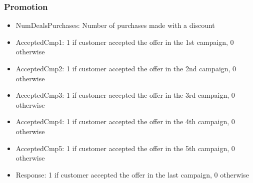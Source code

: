 \documentclass[letterpaper,11pt]{article}
\begin{document}
\subsubsection*{Promotion}
\begin{itemize}
\item NumDealsPurchases: Number of purchases made with a discount
\item AcceptedCmp1: 1 if customer accepted the offer in the 1st campaign, 0 otherwise
\item AcceptedCmp2: 1 if customer accepted the offer in the 2nd campaign, 0 otherwise
\item AcceptedCmp3: 1 if customer accepted the offer in the 3rd campaign, 0 otherwise
\item AcceptedCmp4: 1 if customer accepted the offer in the 4th campaign, 0 otherwise
\item AcceptedCmp5: 1 if customer accepted the offer in the 5th campaign, 0 otherwise
 \item Response: 1 if customer accepted the offer in the last campaign, 0 otherwise
\end{itemize}
\end{document}
